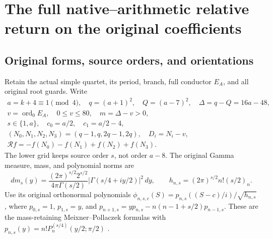 \documentclass[11pt,a4paper]{article}
\begin{document}
\section{The full native--arithmetic relative return on the original coefficients}

\subsection{Original forms, source orders, and orientations}
Retain the actual simple quartet, its period, branch, full conductor
$E_A$, and all original root guards. Write
\begin{equation}\tag{NMR1}\label{a03cm:nmr:domain}
\begin{gathered}
a=k+4\equiv1\pmod4,\quad q=(a+1)^2,\quad Q=(a-7)^2,\quad
\Delta=q-Q=16a-48,\\ v=\operatorname{ord}_0E_A,\quad
0\leq v\leq80,\quad m=\Delta-v>0,\\
s\in\{1,a\},\quad c_0=a/2,\quad c_1=a/2-4,\\
(N_0,N_1,N_2,N_3)=(q-1,q,2q-1,2q),\quad D_i=N_i-v,\\
\mathcal R f=-f(N_0)-f(N_1)+f(N_2)+f(N_3).
\end{gathered}
\end{equation}
The lower grid keeps source order $s$, not order $a-8$.
The original Gamma measure, mass, and polynomial norms are
\begin{equation}\tag{NMR2}\label{a03cm:nmr:gamma}
dm_s(y)=\frac{(2\pi)^{s/2}2^{s/2}}{4\pi\Gamma(s/2)}
 |\Gamma(s/4+iy/2)|^2\,dy,\qquad
h_{n,s}=(2\pi)^{s/2}n!(s/2)_n .
\end{equation}
Use its original orthonormal polynomials
$\phi_{n,s,c}(S)=p_{n,s}((S-c)/i)/\sqrt{h_{n,s}}$,
where $p_{0,s}=1$, $p_{1,s}=y$, and
$p_{n+1,s}=yp_{n,s}-n(n-1+s/2)p_{n-1,s}$.
These are the mass-retaining Meixner--Pollaczek formulas with
$p_{n,s}(y)=n!P_n^{(s/4)}(y/2;\pi/2)$
\cite{a03cm:human:dlmf18}.
\end{document}
